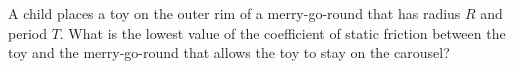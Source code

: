A child places a toy on the outer rim of a merry-go-round that has
radius $R$ and period $T$. What is the lowest value of the
coefficient of static friction between the toy and the merry-go-round that
allows the toy to stay on the carousel?
